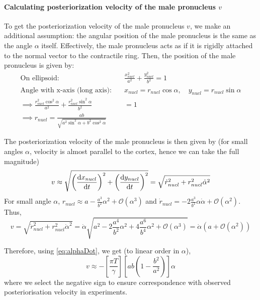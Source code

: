 \paragraph{Calculating posteriorization velocity of the male pronucleus $v$}
To get the posteriorization velocity of the male pronucleus $v$, we make an additional assumption: the angular position of the male pronucleus is the same as the angle $\alpha$ itself. Effectively, the male pronucleus acts as if it is rigidly attached to the normal vector to the contractile ring. Then, the position of the male pronucleus is given by:
\begin{align*}
    \textrm{On ellipsoid:}\quad & \frac{x_{nucl}^2}{a^2} + \frac{y_{nucl}^2}{b^2} = 1\\
    \textrm{Angle with x-axis (long axis):}\quad & x_{nucl} = r_{nucl}\cos\alpha, \quad y_{nucl} = r_{nucl}\sin\alpha\\
    \implies \frac{r_{nucl}^2\cos^2\alpha}{a^2} + \frac{r_{nucl}^2\sin^2\alpha}{b^2} &= 1\\
    \implies r_{nucl} = \frac{ab}{\sqrt{a^2\sin^2\alpha + b^2\cos^2\alpha}}
\end{align*}

The posteriorization velocity of the male pronucleus is then given by (for small angles $\alpha$, velocity is almost parallel to the cortex, hence we can take the full magnitude)
\begin{align*}
    v \approx \sqrt{\left(\dv{x_{nucl}}{t}\right)^2 + \left(\dv{y_{nucl}}{t}\right)^2} = \sqrt{\dot{r}_{nucl}^2 + r_{nucl}^2\dot{\alpha}^2} 
\end{align*}
For small angle $\alpha$, $r_{nucl} \approx a - \frac{a^3}{b^2}\alpha^2 + \mathcal{O}(\alpha^3)$ and $\dot{r}_{nucl} = -2\frac{a^3}{b^2}\alpha\dot{\alpha} + \mathcal{O}(\alpha^2)$. Thus,
\begin{equation*}
    v = \sqrt{\dot{r}_{nucl}^2 + r_{nucl}^2\dot{\alpha}^2} = \dot{\alpha}\sqrt{a^2 - 2\frac{a^4}{b^2}\alpha^2 + 4\frac{a^6}{b^4}\alpha^2 + \mathcal{O}(\alpha^3)} = \dot{\alpha}\left(a + \mathcal{O}(\alpha^2)\right)
\end{equation*}

Therefore, using \eqref{eq:alphaDot}, we get (to linear order in $\alpha$),
\begin{equation}\label{eq:velocity}
    v \approx - \left[\frac{\pi T}{\gamma}\right] \left[ab\left(1 - \frac{b^2}{a^2}\right)\right]\alpha
\end{equation}
where we select the negative sign to ensure correspondence with observed posteriorisation velocity in experiments.

